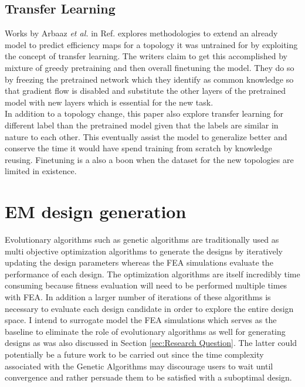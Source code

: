 \documentclass{report} %
\begin{document}
\subsection{Transfer Learning}\label{subsec:LR Transfer Learning}
Works by Arbaaz \textit{et al.} in Ref. \cite{EM TL-2020} explores methodologies to extend an already model to predict efficiency maps for a topology it was untrained for 
by exploiting the concept of transfer learning. The writers claim to get this accomplished by mixture of greedy pretraining and then overall finetuning the model.
They do so by freezing the pretrained network which they identify as common knowledge so that gradient flow is disabled and substitute the other 
layers of the pretrained model with new layers which is essential for the new task.\\
In addition to a topology change, this paper also explore transfer learning for different label than the pretrained model given that the labels are similar in nature 
to each other. This eventually assist the model to generalize better and conserve the time it would have spend training from scratch by knowledge reusing. 
Finetuning is a also a boon when the dataset for the new topologies are limited in existence.\\


\section{EM design generation}\label{sec:LR EM design generation}
Evolutionary algorithms such as genetic algorithms are traditionally used as multi objective optimization algorithms to generate the designs by iteratively
updating the design parameters whereas the \ac{FEA} simulations evaluate the performance of each design. 
The optimization algorithms are itself incredibly time consuming because fitness evaluation will need to be performed multiple times with \ac{FEA}.
In addition a larger number of iterations of these algorithms is necessary to evaluate each design candidate in order to explore the entire design space.
I intend to surrogate model the \ac{FEA} simulations which serves as the baseline to eliminate the role of evolutionary algorithms as well for generating designs as 
was also discussed in Section \ref{sec:Research Question}. The latter could potentially be a future work to be carried out since the time complexity associated with the 
Genetic Algorithms may discourage users to wait until convergence and rather persuade them to be satisfied with a suboptimal design.\\
\end{document}
